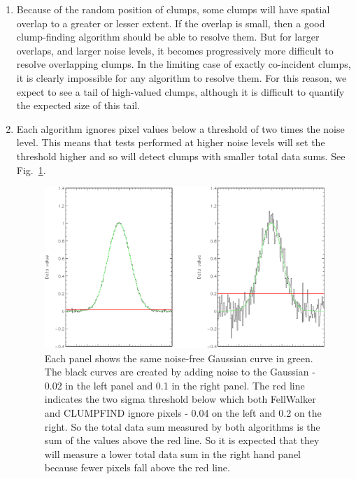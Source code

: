 \documentclass[final,authoryear,5p,times,twocolumn]{elsarticle}
\begin{document}
\begin{enumerate}

\item Because of the random position of clumps, some clumps will have
spatial overlap to a greater or lesser extent. If the overlap is small,
then a good clump-finding algorithm should be able to resolve them. But
for larger overlaps, and larger noise levels, it becomes progressively
more difficult to resolve overlapping clumps. In the limiting case of
exactly co-incident clumps, it is clearly impossible for any algorithm
to resolve them. For this reason, we expect to see a tail of high-valued
clumps, although it is difficult to quantify the expected size of this
tail.

\item Each algorithm ignores pixel values below a threshold of two times the
noise level. This means that tests performed at higher noise levels will
set the threshold higher and so will detect clumps with smaller total
data sums. See Fig.~\ref{fig:comp5}.

\begin{figure}
\includegraphics[width=\columnwidth]{comp5}
\caption{Each panel shows the same noise-free Gaussian curve in green.
The black curves are created by adding noise to the Gaussian - 0.02 in
the left panel and 0.1 in the right panel. The red line indicates the two
sigma threshold below which both FellWalker and CLUMPFIND ignore pixels -
0.04 on the left and 0.2 on the right. So the total data sum measured by
both algorithms is the sum of the values above the red line. So it is
expected that they will measure a lower total data sum in the right hand
panel because fewer pixels fall above the red line.
}
\label{fig:comp5}
\end{figure}

\end{enumerate}
\end{document}
